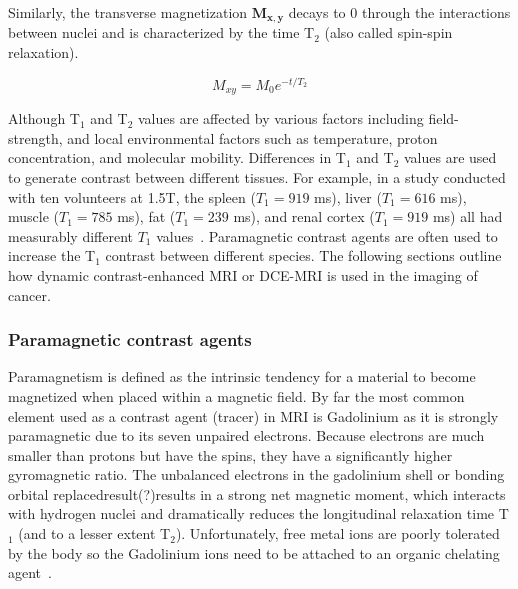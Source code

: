 Similarly, the transverse magnetization $\mathbf{M_{x,y}}$ decays to 0 through the interactions between nuclei and is characterized by the time T$_2$ (also called spin-spin relaxation).
		
\begin{equation}
		M_{xy} = M_0 e^{-t/T_2}
		\label{T2}
\end{equation}

Although T$_1$ and T$_2$ values are affected by various factors including field-strength, and local environmental factors such as temperature, proton concentration, and molecular mobility. 
Differences in T$_1$ and T$_2$ values are used to generate contrast between different tissues. 
For example, in a study conducted with ten volunteers at 1.5T, the spleen ($T_1 = 919$ ms), liver ($T_1 = 616$ ms), muscle ($T_1 = 785$ ms), fat ($T_1 = 239$ ms), and renal cortex ($T_1 = 919$ ms) all had measurably different $T_1$ values~\cite{OConnor:2009ku}.
Paramagnetic contrast agents are often used to increase the T$_1$ contrast between different species. 
The following sections outline how dynamic contrast-enhanced MRI or \acs{DCE-MRI} is used in the imaging of cancer.

\subsubsection{Paramagnetic contrast agents}

Paramagnetism is defined as the intrinsic tendency for a material to become magnetized when placed within a magnetic field.
By far the most common element used as a contrast agent (tracer) in MRI is Gadolinium as it is strongly paramagnetic due to its seven unpaired electrons.
Because electrons are much smaller than protons but have the spins, they have a significantly higher gyromagnetic ratio.
The unbalanced electrons in the gadolinium shell or bonding orbital replaced{result(?)}{results} in a strong net magnetic moment, which interacts with hydrogen nuclei and dramatically reduces the longitudinal relaxation time T$_1$ (and to a lesser extent T$_2$).
Unfortunately, free metal ions are poorly tolerated by the body so the Gadolinium ions need to be attached to an organic chelating agent~\cite{DeLeonRodriguez:2015bl}.

